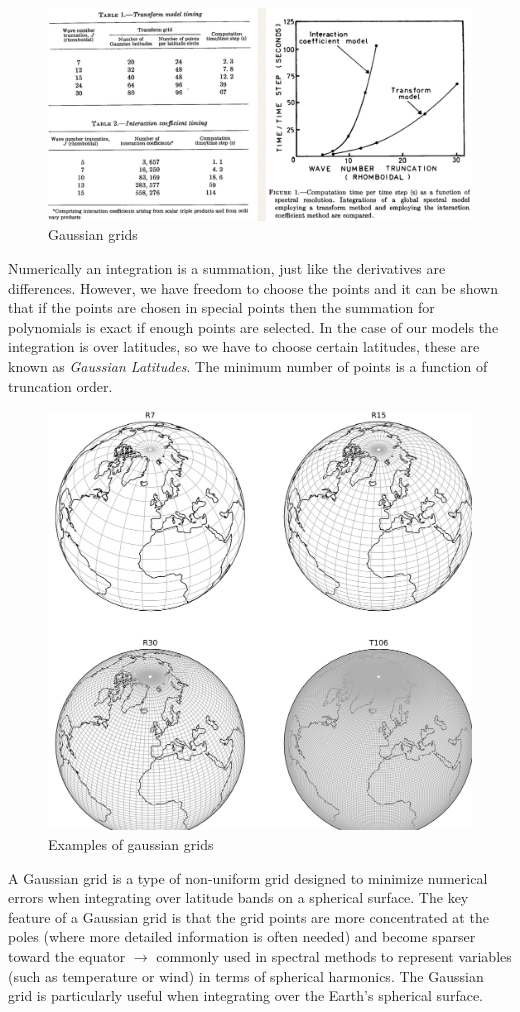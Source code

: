 \begin{figure}[htpb]
	\centering
	\includegraphics[width=0.58\linewidth]{uploads/Screenshot 2024-11-18 100538.png}
	\caption{Gaussian grids}
	\label{fig:gaussian grids}
\end{figure}

Numerically an integration is a summation, just like the derivatives are differences. However, we have freedom to choose the points and it can be shown that if the points are chosen in special points then the summation for polynomials is exact if enough points are selected. In the case of our models the integration is over latitudes, so we have to choose certain latitudes, these are known as \textit{Gaussian Latitudes}. The minimum number of points is a function of truncation order.

\begin{figure}[htpb]
	\centering
	\includegraphics[width=0.5\linewidth]{uploads/gaussian grids.png}
	\caption{Examples of gaussian grids}
	\label{fig:enter-label}
\end{figure}
A Gaussian grid is a type of non-uniform grid designed to minimize numerical errors when integrating over latitude bands on a spherical surface. The key feature of a Gaussian grid is that the grid points are more concentrated at the poles (where more detailed information is often needed) and become sparser toward the equator $\rightarrow$ commonly used in spectral methods to represent variables (such as temperature or wind) in terms of spherical harmonics. The Gaussian grid is particularly useful when integrating over the Earth's spherical surface.
